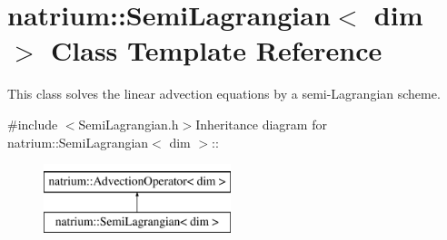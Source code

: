 \hypertarget{classnatrium_1_1SemiLagrangian}{
\section{natrium::SemiLagrangian$<$ dim $>$ Class Template Reference}
\label{classnatrium_1_1SemiLagrangian}
}


This class solves the linear advection equations by a semi-\/Lagrangian scheme.  


{\ttfamily \#include $<$SemiLagrangian.h$>$}Inheritance diagram for natrium::SemiLagrangian$<$ dim $>$::\begin{figure}[H]
\begin{center}
\leavevmode
\includegraphics[height=2cm]{classnatrium_1_1SemiLagrangian}
\end{center}
\end{figure}
